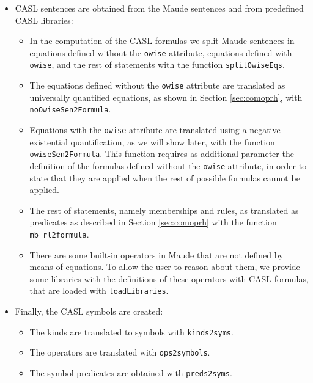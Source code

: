 \begin{itemize}
\item CASL sentences are obtained from the Maude sentences and from
predefined CASL libraries:

\begin{itemize}
\item In the computation of the CASL formulas we split Maude sentences in
equations defined without the \verb"owise" attribute, equations defined
with \verb"owise", and the rest of statements with the function
\verb"splitOwiseEqs".
\item The equations defined without the \verb"owise" attribute are
translated as universally quantified equations, as shown in Section
\ref{sec:comoprh}, with \verb"noOwiseSen2Formula".
\item Equations with the \verb"owise" attribute are translated using
a negative existential quantification, as we will show later, with
the function \verb"owiseSen2Formula". This function requires as additional
parameter the definition of the formulas defined without the \verb"owise"
attribute, in order to state that they are applied when the rest of
possible formulas cannot be applied.
\item The rest of statements, namely memberships and rules, as translated
as predicates as described in Section \ref{sec:comoprh} with the function
\verb"mb_rl2formula".
\item There are some built-in operators in Maude that are not defined by
means of equations. To allow the user to reason about them, we provide
some libraries with the definitions of these operators with CASL formulas,
that are loaded with \verb"loadLibraries".
\end{itemize}

\item Finally, the CASL symbols are created:

\begin{itemize}
\item The kinds are translated to symbols with \verb"kinds2syms".
\item The operators are translated with \verb"ops2symbols".
\item The symbol predicates are obtained with \verb"preds2syms".
\end{itemize}

\end{itemize}

